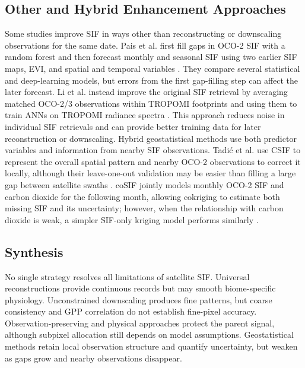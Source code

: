\subsection{Other and Hybrid Enhancement Approaches}

Some studies improve SIF in ways other than reconstructing or downscaling observations for the same date. Pais et al. first fill gaps in OCO-2 SIF with a random forest and then forecast monthly and seasonal SIF using two earlier SIF maps, EVI, and spatial and temporal variables \cite{pais2025forecasting}. They compare several statistical and deep-learning models, but errors from the first gap-filling step can affect the later forecast. Li et al. instead improve the original SIF retrieval by averaging matched OCO-2/3 observations within TROPOMI footprints and using them to train ANNs on TROPOMI radiance spectra \cite{li2025more}. This approach reduces noise in individual SIF retrievals and can provide better training data for later reconstruction or downscaling. Hybrid geostatistical methods use both predictor variables and information from nearby SIF observations. Tadi\'c et al. use CSIF to represent the overall spatial pattern and nearby OCO-2 observations to correct it locally, although their leave-one-out validation may be easier than filling a large gap between satellite swaths \cite{tadic2024hybrid}. coSIF jointly models monthly OCO-2 SIF and carbon dioxide for the following month, allowing cokriging to estimate both missing SIF and its uncertainty; however, when the relationship with carbon dioxide is weak, a simpler SIF-only kriging model performs similarly \cite{jacobson2023spatial}.

\subsection{Synthesis}

No single strategy resolves all limitations of satellite SIF. Universal reconstructions provide continuous records but may smooth biome-specific physiology. Unconstrained downscaling produces fine patterns, but coarse consistency and GPP correlation do not establish fine-pixel accuracy. Observation-preserving and physical approaches protect the parent signal, although subpixel allocation still depends on model assumptions. Geostatistical methods retain local observation structure and quantify uncertainty, but weaken as gaps grow and nearby observations disappear.

